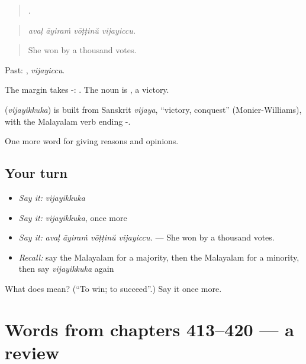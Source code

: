 \begin{quote}
   .
\end{quote}

\begin{quote}
\emph{avaḷ āyiraṁ vōṭṭinŭ vijayiccu.}
\end{quote}

\begin{quote}
She won by a thousand votes.
\end{quote}

Past: , \emph{vijayiccu}.

The margin takes -:  . The noun is , a victory.

\begin{cousinweb}
\textbf{} (\emph{vijayikkuka}) is built from Sanskrit \emph{vijaya}, \textquotedblleft{}victory, conquest\textquotedblright{} (Monier-Williams), with the Malayalam verb ending -.
\end{cousinweb}

\begin{grammarlens}[title={What you've built}]
One more word for giving reasons and opinions.
\end{grammarlens}

\subsection*{Your turn}
\begin{itemize}
\raggedright
  \item \emph{Say it:} \emph{vijayikkuka}
  \item \emph{Say it:} \emph{vijayikkuka}, once more
  \item \emph{Say it:} \emph{avaḷ āyiraṁ vōṭṭinŭ vijayiccu.} — She won by a thousand votes.
  \item \emph{Recall:} say the Malayalam for a majority, then the Malayalam for a minority, then say \emph{vijayikkuka} again
\end{itemize}

\begin{tcolorbox}[breakable,colback=teal!4,colframe=teal!35!black,title={Before you move on}]
What does  mean? (\textquotedblleft{}To win; to succeed\textquotedblright{}.) Say it once more.
\end{tcolorbox}
\section[(dialogue)]{Words from chapters 413–420 — a review}

